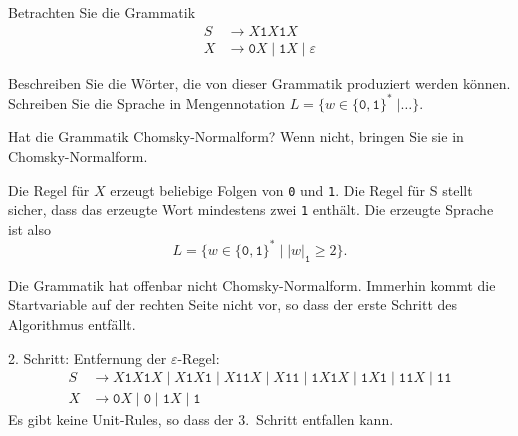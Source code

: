 Betrachten Sie die Grammatik
\begin{align*}
S & \to X \texttt{1} X \texttt{1} X \\
X & \to \texttt{0} X  \mid  \texttt{1} X \mid  \varepsilon
\end{align*}
\begin{teilaufgaben}
\item
Beschreiben Sie die Wörter, die von dieser Grammatik produziert werden können.
Schreiben Sie die Sprache in Mengennotation
$L=\{w\in\{\texttt{0},\texttt{1}\}^*\;|\dots\}$.
\item
Hat die Grammatik Chomsky-Normalform?
Wenn nicht, bringen Sie sie in Chomsky-Normalform.
\end{teilaufgaben}


\begin{loesung}
\begin{teilaufgaben}
\item
Die Regel für $X$ erzeugt beliebige Folgen von \texttt{0} und \texttt{1}.
Die Regel für S stellt sicher, dass das erzeugte Wort mindestens zwei
\texttt{1} enthält.
Die erzeugte Sprache ist also
\[
L=\{
w\in\{\texttt{0},\texttt{1}\}^*
\mid 
|w|_{\texttt{1}} \ge 2\}.
\]
\item
Die Grammatik hat offenbar nicht Chomsky-Normalform.
Immerhin kommt die Startvariable auf der rechten Seite nicht vor,
so dass der erste Schritt des Algorithmus entfällt.

2. Schritt: Entfernung der $\varepsilon$-Regel:
\begin{align*}
S & \to
X \texttt{1} X \texttt{1} X
\mid 
X \texttt{1} X \texttt{1} 
\mid 
X \texttt{1}   \texttt{1} X
\mid 
X \texttt{1}   \texttt{1} 
\mid 
  \texttt{1} X \texttt{1} X
\mid 
  \texttt{1} X \texttt{1}  
\mid 
  \texttt{1}   \texttt{1} X
\mid 
  \texttt{1}   \texttt{1}  
\\
X & \to
\texttt{0} X
\mid 
\texttt{0}
\mid 
\texttt{1} X
\mid 
\texttt{1}
\end{align*}
Es gibt keine Unit-Rules, so dass der 3.~Schritt entfallen kann.


\end{teilaufgaben}
\end{loesung}
